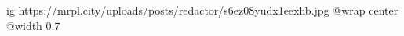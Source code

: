  
 
 
 
 

\ifcmt
  ig https://mrpl.city/uploads/posts/redactor/s6ez08yudx1eexhb.jpg
  @wrap center
  @width 0.7
\fi
